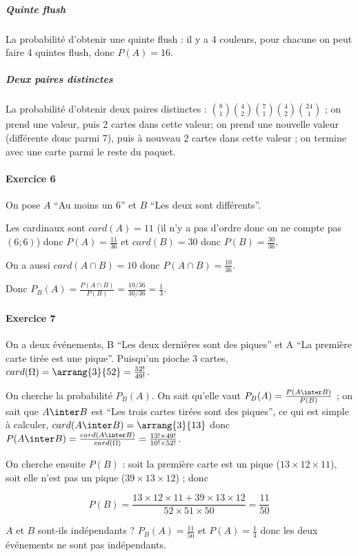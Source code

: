 \documentclass[10pt,a4paper,french]{article}
\begin{document}
\subparagraph{Quinte flush}
La probabilité d'obtenir une quinte flush : il y a 4 couleurs, pour chacune on peut faire 4 quintes flush, donc $P(A)=16$.

\subparagraph{Deux paires distinctes}
La probabilité d'obtenir deux paires distinctes : ${8 \choose 1}{4 \choose 2}{7 \choose 1}{4 \choose 2}{24 \choose 1}$ ; on prend une valeur, puis 2 cartes dans cette valeur; on prend une nouvelle valeur (différente donc parmi 7), puis à nouveau 2 cartes dans cette valeur ; on termine avec une carte parmi le reste du paquet.

\paragraph{Exercice 6}
On pose $A$ ``Au moins un 6'' et $B$ ``Les deux sont différents''.

Les cardinaux sont $card(A)=11$ (il n'y a pas d'ordre donc on ne compte pas $(6; 6)$) donc $P(A)=\frac{11}{36}$ et $card(B)=30$ donc $P(B)=\frac{30}{36}$.

On a aussi $card(A \cap B)=10$ donc $P(A \cap B)=\frac{10}{36}$.

Donc $P_B(A) = \frac{P(A \cap B)}{P(B)} = \frac{10 / 36}{30 / 36} = \frac{1}{3}$.

\paragraph{Exercice 7}
On a deux événements, B ``Les deux dernières sont des piques'' et A ``La première carte tirée est une pique''. Puisqu'un pioche 3 cartes, $card(\Omega) = \arrang{3}{52} = \frac{52!}{49!}$.

On cherche la probabilité $P_B(A)$. On sait qu'elle vaut $P_B(A) = \frac{P(A \inter B)}{P(B)}$ ; on sait que $A \inter B$ est ``Les trois cartes tirées sont des piques'', ce qui est simple à calculer, $card(A\inter B) = \arrang{3}{13}$ donc $P(A\inter B) = \frac{card(A\inter B)}{card(\Omega)} = \frac{13! \times 49!}{10! \times 52!}$.

On cherche ensuite $P(B)$ : soit la première carte est un pique ($13 \times 12 \times 11$), soit elle n'est pas un pique ($39 \times 13 \times 12$) ; donc

\[
P(B) = \frac{13 \times 12 \times 11 + 39 \times 13 \times 12}{52 \times 51 \times 50} = \frac{11}{50}
\]

$A$ et $B$ sont-ils indépendants ? $P_B(A)=\frac{11}{50}$ et $P(A)=\frac{1}{4}$ donc les deux événements ne sont pas indépendants.
\end{document}
